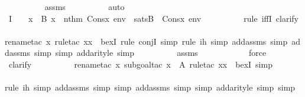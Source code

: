 \begin{isabellebody}
\ \ \ \ \ \ \ \ \isamarkupfalse%
\ assms{}\isanewline
\ \ \ \ \ \ \ \ \isamarkupfalse%
\ auto\isanewline
\ \ \ \ \ \ \isamarkupfalse%
\ I{}\ {\isacharcolon}{\kern0pt}\ {\isachardoublequoteopen}{\isachardot}{\kern0pt}{\isachardot}{\kern0pt}{\isachardot}{\kern0pt}\ {\isasymlongleftrightarrow}\ {\isacharparenleft}{\kern0pt}{\isasymexists}x\ {\isasymin}\ B{\isachardot}{\kern0pt}\ x\ {\isasymin}\ nth{\isacharparenleft}{\kern0pt}m{\isacharcomma}{\kern0pt}\ Cons{\isacharparenleft}{\kern0pt}x{\isacharcomma}{\kern0pt}\ env{\isacharparenright}{\kern0pt}{\isacharparenright}{\kern0pt}\ {\isasymand}\ sats{\isacharparenleft}{\kern0pt}B{\isacharcomma}{\kern0pt}\ {\isasymphi}{\isacharcomma}{\kern0pt}\ Cons{\isacharparenleft}{\kern0pt}x{\isacharcomma}{\kern0pt}\ env{\isacharparenright}{\kern0pt}{\isacharparenright}{\kern0pt}{\isacharparenright}{\kern0pt}{\isachardoublequoteclose}\ \isanewline
\ \ \ \ \ \ \ \ \isamarkupfalse%
{\isacharparenleft}{\kern0pt}rule\ iffI{\isacharcomma}{\kern0pt}\ clarify{\isacharparenright}{\kern0pt}\isanewline
\ \ \ \ \ \ \ \ \ \isamarkupfalse%
{\isacharparenleft}{\kern0pt}rename{\isacharunderscore}{\kern0pt}tac\ x{\isacharcomma}{\kern0pt}\ rule{\isacharunderscore}{\kern0pt}tac\ x{\isacharequal}{\kern0pt}x\ \ bexI{\isacharcomma}{\kern0pt}\ rule\ conjI{\isacharcomma}{\kern0pt}\ simp{\isacharcomma}{\kern0pt}\ rule\ ih{}{\isacharcomma}{\kern0pt}\ simp\ add{\isacharcolon}{\kern0pt}assms{}{\isacharcomma}{\kern0pt}\ simp\ add{\isacharcolon}{\kern0pt}assms{}{\isacharcomma}{\kern0pt}\ simp{\isacharcomma}{\kern0pt}\ simp\ add{\isacharcolon}{\kern0pt}arityle{\isacharcomma}{\kern0pt}\ simp{\isacharparenright}{\kern0pt}\isanewline
\ \ \ \ \ \ \ \ \isamarkupfalse%
\ assms\ \isanewline
\ \ \ \ \ \ \ \ \ \isamarkupfalse%
\ force\isanewline
\ \ \ \ \ \ \ \ \isamarkupfalse%
\ clarify\ \isanewline
\ \ \ \ \ \ \ \ \isamarkupfalse%
{\isacharparenleft}{\kern0pt}rename{\isacharunderscore}{\kern0pt}tac\ x{\isacharcomma}{\kern0pt}\ subgoal{\isacharunderscore}{\kern0pt}tac\ {\isachardoublequoteopen}x\ {\isasymin}\ A{\isachardoublequoteclose}{\isacharcomma}{\kern0pt}\ rule{\isacharunderscore}{\kern0pt}tac\ x{\isacharequal}{\kern0pt}x\ \ bexI{\isacharcomma}{\kern0pt}\ simp{\isacharparenright}{\kern0pt}\isanewline
\ \ \ \ \ \ \ \ \ \ \isamarkupfalse%
{\isacharparenleft}{\kern0pt}rule\ ih{}{\isacharcomma}{\kern0pt}\ simp\ add{\isacharcolon}{\kern0pt}assms{}{\isacharcomma}{\kern0pt}\ simp{\isacharcomma}{\kern0pt}\ simp\ add{\isacharcolon}{\kern0pt}assms{}{\isacharcomma}{\kern0pt}\ simp{\isacharcomma}{\kern0pt}\ simp\ add{\isacharcolon}{\kern0pt}arityle{\isacharcomma}{\kern0pt}\ simp{\isacharcomma}{\kern0pt}\ simp{\isacharparenright}{\kern0pt}\isanewline

\end{isabellebody}
